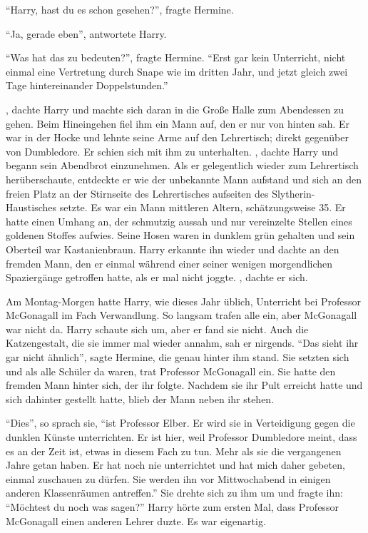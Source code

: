\enquote{Harry, hast du es schon gesehen?}, fragte Hermine.

\enquote{Ja, gerade eben}, antwortete Harry.

\enquote{Was hat das zu bedeuten?}, fragte Hermine. \enquote{Erst gar kein Unterricht, nicht einmal eine Vertretung durch Snape wie im dritten Jahr, und jetzt gleich zwei Tage hintereinander Doppelstunden.}

, dachte Harry und machte sich daran in die Große Halle zum Abendessen zu gehen. Beim Hineingehen fiel ihm ein Mann auf, den er nur von hinten sah. Er war in der Hocke und lehnte seine Arme auf den Lehrertisch; direkt gegenüber von Dumbledore. Er schien sich mit ihm zu unterhalten. , dachte Harry und begann sein Abendbrot einzunehmen. Als er gelegentlich wieder zum Lehrertisch herüberschaute, entdeckte er wie der unbekannte Mann aufstand und sich an den freien Platz an der Stirnseite des Lehrertisches aufseiten des Slytherin-Haustisches setzte. Es war ein Mann mittleren Altern, schätzungsweise 35. Er hatte einen Umhang an, der schmutzig aussah und nur vereinzelte Stellen eines goldenen Stoffes aufwies. Seine Hosen waren in dunklem grün gehalten und sein Oberteil war Kastanienbraun. Harry erkannte ihn wieder und dachte an den fremden Mann, den er einmal während einer seiner wenigen morgendlichen Spaziergänge getroffen hatte, als er mal nicht joggte. , dachte er sich. 

\trenn

Am Montag-Morgen hatte Harry, wie dieses Jahr üblich, Unterricht bei Professor McGonagall im Fach Verwandlung. So langsam trafen alle ein, aber McGonagall war nicht da. Harry schaute sich um, aber er fand sie nicht. Auch die Katzengestalt, die sie immer mal wieder annahm, sah er nirgends. \enquote{Das sieht ihr gar nicht ähnlich}, sagte Hermine, die genau hinter ihm stand. Sie setzten sich und als alle Schüler da waren, trat Professor McGonagall ein. Sie hatte den fremden Mann hinter sich, der ihr folgte. Nachdem sie ihr Pult erreicht hatte und sich dahinter gestellt hatte, blieb der Mann neben ihr stehen.

\enquote{Dies}, so sprach sie, \enquote{ist Professor Elber. Er wird sie in Verteidigung gegen die dunklen Künste unterrichten. Er ist hier, weil Professor Dumbledore meint, dass es an der Zeit ist, etwas in diesem Fach zu tun. Mehr als sie die vergangenen Jahre getan haben. Er hat noch nie unterrichtet und hat mich daher gebeten, einmal zuschauen zu dürfen. Sie werden ihn vor Mittwochabend in einigen anderen Klassenräumen antreffen.} Sie drehte sich zu ihm um und fragte ihn: \enquote{Möchtest du noch was sagen?} Harry hörte zum ersten Mal, dass Professor McGonagall einen anderen Lehrer duzte. Es war eigenartig.

